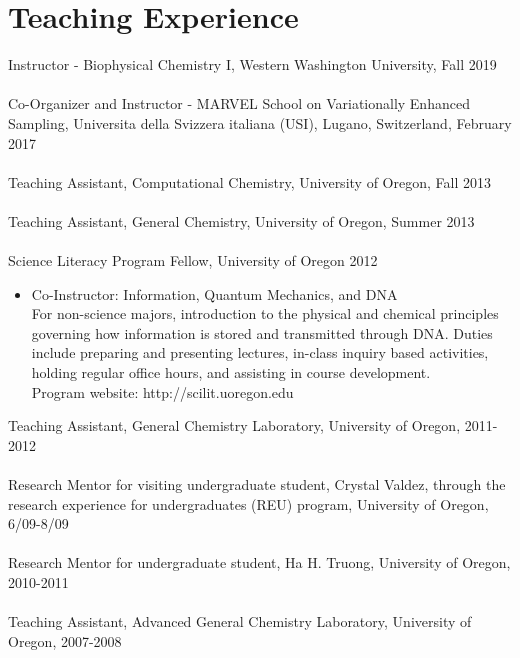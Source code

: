 \documentclass[10pt]{article} %
\begin{document}
\section{Teaching Experience}
Instructor - Biophysical Chemistry I, Western Washington University, Fall 2019 \\
\\
Co-Organizer and Instructor - MARVEL School on Variationally Enhanced Sampling, Universita della Svizzera italiana (USI), Lugano, Switzerland, February 2017 \\
\\
Teaching Assistant, Computational Chemistry, University of Oregon, Fall 2013 \\
\\
Teaching Assistant, General Chemistry, University of Oregon, Summer 2013 \\
\\
Science Literacy Program Fellow, University of Oregon 2012 \\
\begin{itemize}
\item Co-Instructor: Information, Quantum Mechanics, and DNA \\
For non-science majors, introduction to the physical and chemical principles governing how information is stored and transmitted through DNA. Duties include preparing and presenting lectures, in-class inquiry based activities, holding regular office hours, and assisting in course development. \\ 
Program website: http://scilit.uoregon.edu
\end{itemize} 
Teaching Assistant, General Chemistry Laboratory, University of Oregon, 2011-2012 \\
\\
Research Mentor for visiting undergraduate student, Crystal Valdez, through the  research experience for undergraduates (REU) program, University of Oregon, 6/09-8/09 \\
\\
Research Mentor for undergraduate student, Ha H. Truong, University of Oregon, 2010-2011 \\
\\
Teaching Assistant, Advanced General Chemistry Laboratory, University of Oregon, 2007-2008 \\
\end{document}
